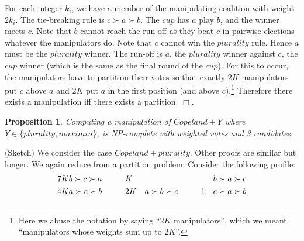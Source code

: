 \documentclass{ecai2012}
\newcommand{\winner}[2]{\mbox{$#1 + #2$}}
\newtheorem{proposition}{Proposition}
\newcommand{\myproof}{\vspace{-3mm}\noindent {\bf Proof:\ \ }}
\newcommand{\myqed}{\mbox{$\Box$}}
\begin{document}
\vspace{-2mm}For each
integer $k_i$, we have a member of the manipulating coalition
with weight $2k_i$.
The tie-breaking rule is $c \succ a \succ b$.
The $cup$ has $a$ play $b$, and the winner
meets $c$. Note that $b$ cannot reach the
run-off as they beat $c$ in pairwise
elections whatever the manipulators do.
Note that $c$ cannot win the $plurality$
rule. Hence $a$ must be the $plurality$ winner.
The run-off is $a$, the $plurality$ winner
against $c$, the $cup$ winner (which is the
same as the final round of the $cup$).
For this to occur, the manipulators have to partition
their votes so that exactly $2K$ manipulators put $c$
above $a$ and $2K$ %
put $a$
in the first position (and above $c$).\footnote{Here we abuse the notation by saying ``$2K$ manipulators'', which we meant ``manipulators whose weights sum up to $2K$''.} Therefore there exists a manipulation
iff there exists a partition.
\myqed.

\vspace{-3mm}
\begin{proposition}
Computing a manipulation of $\winner{Copeland}{Y}$ where
$Y \in \{plurality, maximin\}$,
is NP-complete with weighted votes and 3 candidates.
\end{proposition}
\myproof (Sketch)
We consider the case $\winner{Copeland}{plurality}$.
Other proofs are similar but longer.
We again reduce from a  {\sc  partition} problem.
Consider the following profile:
\vspace{-2mm}\begin{eqnarray*}
7K&b \succ c \succ a \hspace{10mm}
K&b \succ a \succ c \\
4K&a \succ c \succ b \hspace{10mm}
2K&a \succ b \succ c \hspace{10mm}
1\ \ \  c \succ a \succ b
\end{eqnarray*}
\end{document}
